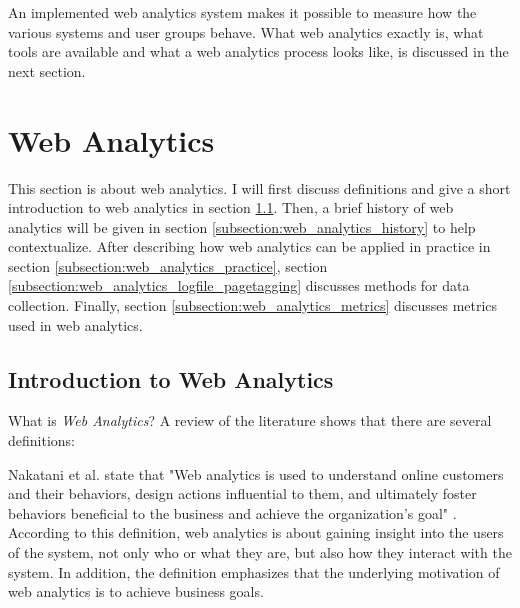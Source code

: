 An implemented web analytics system makes it possible to measure how the various systems and user groups behave.
What web analytics exactly is, what tools are available and what a web analytics process looks like, is discussed in the next section.








\section{Web Analytics} %
\label{section:web_analytics}

This section is about web analytics.
I will first discuss definitions and give a short introduction to web analytics in section \ref{section:web_analytics_introduction}.
Then, a brief history of web analytics will be given in section \ref{subsection:web_analytics_history} to help contextualize.
After describing how web analytics can be applied in practice in section \ref{subsection:web_analytics_practice}, section \ref{subsection:web_analytics_logfile_pagetagging} discusses methods for data collection.
Finally, section \ref{subsection:web_analytics_metrics} discusses metrics used in web analytics.


\subsection{Introduction to Web Analytics} %
\label{section:web_analytics_introduction}

What is \textit{Web Analytics}?
A review of the literature shows that there are several definitions:

Nakatani et al. state that "Web analytics is used to understand online customers and their behaviors, design actions influential to them, and ultimately foster behaviors beneficial to the business and achieve the organization's goal" \cite{2011Nakatani}.
According to this definition, web analytics is about gaining insight into the users of the system, not only who or what they are, but also how they interact with the system.
In addition, the definition emphasizes that the underlying motivation of web analytics is to achieve business goals.


